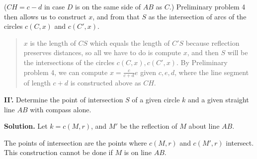 \documentclass[11pt,a4paper]{article}
\begin{document}
($CH = c - d$ in case $D$ is on the same side of $AB$ as $C$.) Preliminary problem 4 then allows us to construct $x$, and from that $S$ as the intersection of arcs of the circles $c(C,x)$ and $c(C',x)$.

\begin{quote}
$x$ is the length of $CS$ which equals the length of $C'S$ because reflection preserves distances, so all we have to do is compute $x$, and then $S$ will be the intersections of the circles $c(C,x), c(C',x)$. By Preliminary problem 4, we can compute $x=\frac{c}{c+d}e$ given $c,e,d$, where the line segment of length $c+d$ is constructed above as $CH$.
\end{quote}


\textbf{II’.} Determine the point of intersection $S$ of a given circle $k$ and a given straight line $AB$ with compass alone.

\textbf{Solution.} Let $k = c(M,r)$, and $M'$ be the reflection of $M$ about line $AB$.

\begin{center}
\end{center}

The points of intersection are the points where $c(M,r)$ and $c(M',r)$ intersect. This construction cannot be done if $M$ is on line $AB$.
\end{document}
